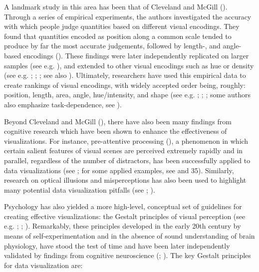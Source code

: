 \documentclass[
  openany]{book}
\theoremstyle{definition}
\theoremstyle{definition}
\theoremstyle{definition}
\theoremstyle{definition}
\theoremstyle{remark}
\begin{document}
A landmark study in this area has been that of Cleveland and McGill (). Through a series of empirical experiments, the authors investigated the accuracy with which people judge quantities based on different visual encodings. They found that quantities encoded as position along a common scale tended to produce by far the most accurate judgements, followed by length-, and angle-based encodings (). These findings were later independently replicated on larger samples (see e.g. ), and extended to other visual encodings such as hue or density (see e.g. ; ; ; see also ). Ultimately, researchers have used this empirical data to create rankings of visual encodings, with widely accepted order being, roughly: position, length, area, angle, hue/intensity, and shape (see e.g. ; ; ; some authors also emphasize task-dependence, see ).

Beyond Cleveland and McGill (), there have also been many findings from cognitive research which have been shown to enhance the effectiveness of visualizations. For instance, pre-attentive processing (), a phenomenon in which certain salient features of visual scenes are perceived extremely rapidly and in parallel, regardless of the number of distractors, has been successfully applied to data visualizations (see ; for some applied examples, see  and 35). Similarly, research on optical illusions and misperceptions has also been used to highlight many potential data visualization pitfalls (see ; ).

Psychology has also yielded a more high-level, conceptual set of guidelines for creating effective visualizations: the Gestalt principles of visual perception (see e.g. ; ; ). Remarkably, these principles developed in the early 20th century by means of self-experimentation and in the absence of sound understanding of brain physiology, have stood the test of time and have been later independently validated by findings from cognitive neuroscience (; ). The key Gestalt principles for data visualization are:
\end{document}
